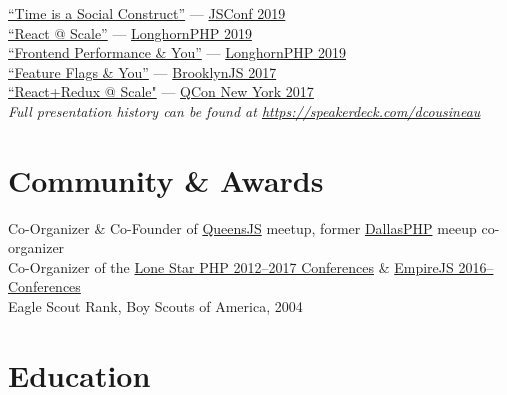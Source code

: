 \documentclass{resume}
\begin{document}
\begin{spacing}{1.25}
\href{https://speakerdeck.com/dcousineau/time-is-a-social-construct}{``Time is a Social Construct''} --- \href{https://2019.jsconf.us/speakers/daniel-cousineau}{JSConf 2019}\\
\href{https://speakerdeck.com/dcousineau/react-at-scale}{``React @ Scale''} --- \href{https://www.longhornphp.com}{LonghornPHP 2019}\\
\href{https://speakerdeck.com/dcousineau/frontend-performance-and-you}{``Frontend Performance \& You''} --- \href{https://www.longhornphp.com}{LonghornPHP 2019}\\
\href{https://speakerdeck.com/dcousineau/feature-flags-and-you}{``Feature Flags \& You''} --- \href{http://brooklynjs.com}{BrooklynJS 2017}\\
\href{https://speakerdeck.com/dcousineau/react-plus-redux-at-scale}{``React+Redux @ Scale"} --- \href{https://qconnewyork.com/ny2017/presentation/reactredux-scale-talk}{QCon New York 2017}\\
\emph{Full presentation history can be found at \href{https://speakerdeck.com/dcousineau}{https://speakerdeck.com/dcousineau}}
\end{spacing}

\section{Community \& Awards}

Co-Organizer \& Co-Founder of \href{http://queensjs.com/}{QueensJS} meetup, former \href{http://www.meetup.com/dallasphp/}{DallasPHP} meeup co-organizer
\\
Co-Organizer of the \href{http://lonestarphp.com/}{Lone Star PHP 2012--2017 Conferences} \& \href{http://empirejs.org/}{EmpireJS 2016-- Conferences}
\\
Eagle Scout Rank, Boy Scouts of America, 2004

\section{Education}

\end{document}
